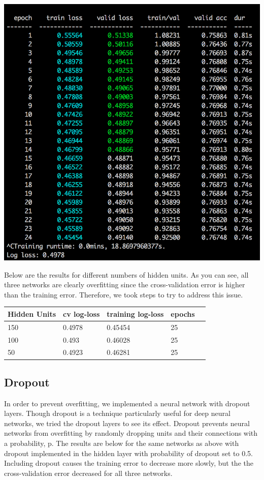 \documentclass[twoside,11pt]{article}
\theoremstyle{definition}
\begin{document}
      \begin{center}
        \includegraphics[scale=0.45]{nn1.jpg}
      \end{center}  

Below are the results for different numbers of hidden units. As you can see, all three networks are clearly overfitting since the cross-validation error is higher than the training error. Therefore, we took steps to try to address this issue. 

      \begin{center}
          \begin{tabular}{ | l | l | l | l | p{5cm} |}
          \hline
          Hidden Units & cv log-loss & training log-loss & epochs \\ \hline
          150 & 0.4978 & 0.45454 & 25 \\ \hline
          100 & 0.493 & 0.46028 & 25 \\ \hline
          50 & 0.4923 & 0.46281 & 25 \\ \hline 
          \end{tabular}
      \end{center}

\subsection{Dropout}
In order to prevent overfitting, we implemented a neural network with dropout layers. Though dropout is a technique particularly useful for deep neural networks, we tried the dropout layers to see its effect. Dropout prevents neural networks from overfitting by randomly dropping units and their connections with a probability, p.\cite{Dropout} The results are below for the same networks as above with dropout implemented in the hidden layer with probability of dropout set to 0.5. Including dropout causes the training error to decrease more slowly, but the the cross-validation error decreased for all three networks. 
\end{document}
